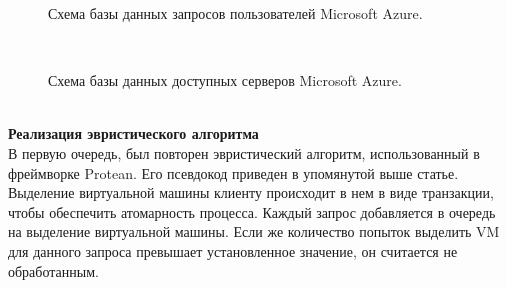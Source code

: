 \documentclass[draft]{article}
\begin{document}
\begin{figure}[h]
\caption{Схема базы данных запросов пользователей Microsoft Azure\cite{litlink22}.}
\label{ris:image}
\end{figure}\\
\begin{figure}[h]
\caption{Схема базы данных доступных серверов Microsoft Azure\cite{litlink22}.}
\label{ris:image}
\end{figure}\\
\textbf{Реализация эвристического алгоритма}\\
В первую очередь, был повторен эвристический алгоритм, использованный в фреймворке Protean. Его псевдокод приведен в упомянутой выше статье. Выделение виртуальной машины клиенту происходит в нем в виде транзакции, чтобы обеспечить атомарность процесса. Каждый запрос добавляется в очередь на выделение виртуальной машины. Если же количество попыток выделить VM для данного запроса превышает установленное значение, он считается не обработанным.\\
\end{document}
